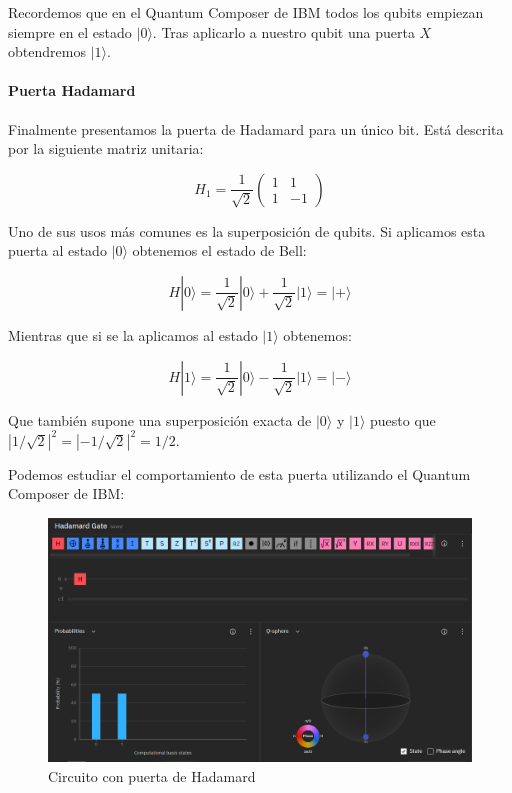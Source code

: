 \documentclass[11pt]{article}
\newcommand{\ra}{\rangle}
\begin{document}
Recordemos que en el Quantum Composer de IBM todos los qubits empiezan siempre en el estado $|0\ra$. Tras aplicarlo a nuestro qubit una puerta $X$ obtendremos $|1\ra$.

\paragraph*{Puerta Hadamard}

Finalmente presentamos la puerta de Hadamard para un único bit. Está descrita por la siguiente matriz unitaria:

\[
	H_1 = \frac{1}{\sqrt 2}
	\begin{pmatrix}
		1 & 1 \\
		1 & -1 
	\end{pmatrix}
\]

Uno de sus usos más comunes es la superposición de qubits. Si aplicamos esta puerta al estado $|0\ra$ obtenemos el estado de Bell:

\[
	H|0\ra = \frac{1}{\sqrt 2} |0\ra + \frac{1}{\sqrt 2} |1\ra = |+\ra
\]

Mientras que si se la aplicamos al estado $|1\ra$ obtenemos:

\[
	H|1\ra = \frac{1}{\sqrt 2} |0\ra - \frac{1}{\sqrt 2} |1\ra = |-\ra
\]

Que también supone una superposición exacta de $|0\ra$ y $|1\ra$ puesto que $|1/\sqrt 2|^2 = |-1/\sqrt 2|^2 = 1/2$.

Podemos estudiar el comportamiento de esta puerta utilizando el Quantum Composer de IBM:

\begin{figure}[H]
	\centering
	\includegraphics[scale=0.4]{figures/gate-hadamard.png}
	\caption{Circuito con puerta de Hadamard}
\end{figure}
\end{document}
